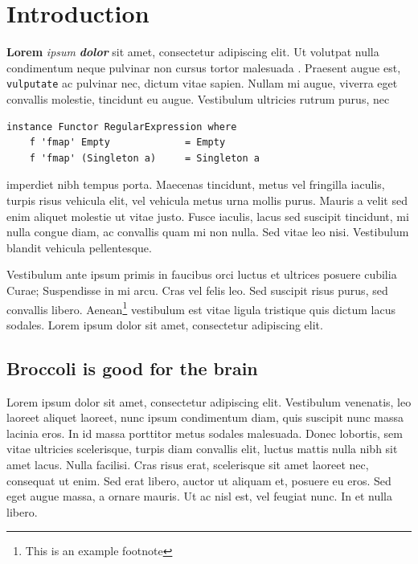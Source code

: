 \section{Introduction}

\textbf{Lorem} \emph{ipsum} \textbf{\emph{dolor}} sit amet, consectetur
adipiscing elit. Ut volutpat nulla condimentum neque pulvinar non cursus
tortor malesuada \citep{halevy2009unreasonable}. Praesent augue est,
\texttt{vulputate} ac pulvinar nec, dictum vitae sapien. Nullam mi
augue, viverra eget convallis molestie, tincidunt eu augue. Vestibulum
ultricies rutrum purus, nec

\begin{verbatim}
instance Functor RegularExpression where
    f 'fmap' Empty             = Empty
    f 'fmap' (Singleton a)     = Singleton a
\end{verbatim}

imperdiet nibh tempus porta. Maecenas tincidunt, metus vel fringilla
iaculis, turpis risus vehicula elit, vel vehicula metus urna mollis
purus. Mauris a velit sed enim aliquet molestie ut vitae justo. Fusce
iaculis, lacus sed suscipit tincidunt, mi nulla congue diam, ac
convallis quam mi non nulla. Sed vitae leo nisi. Vestibulum blandit
vehicula pellentesque.

Vestibulum ante ipsum primis in faucibus orci luctus et ultrices posuere
cubilia Curae; Suspendisse in mi arcu. Cras vel felis leo. Sed suscipit
risus purus, sed convallis libero. Aenean\footnote{This is an example
  footnote} vestibulum est vitae ligula tristique quis dictum lacus
sodales. Lorem ipsum dolor sit amet, consectetur adipiscing elit.

\subsection{Broccoli is good for the brain}

Lorem ipsum dolor sit amet, consectetur adipiscing elit. Vestibulum
venenatis, leo laoreet aliquet laoreet, nunc ipsum condimentum diam,
quis suscipit nunc massa lacinia eros. In id massa porttitor metus
sodales malesuada. Donec lobortis, sem vitae ultricies scelerisque,
turpis diam convallis elit, luctus mattis nulla nibh sit amet lacus.
Nulla facilisi. Cras risus erat, scelerisque sit amet laoreet nec,
consequat ut enim. Sed erat libero, auctor ut aliquam et, posuere eu
eros. Sed eget augue massa, a ornare mauris. Ut ac nisl est, vel feugiat
nunc. In et nulla libero.

